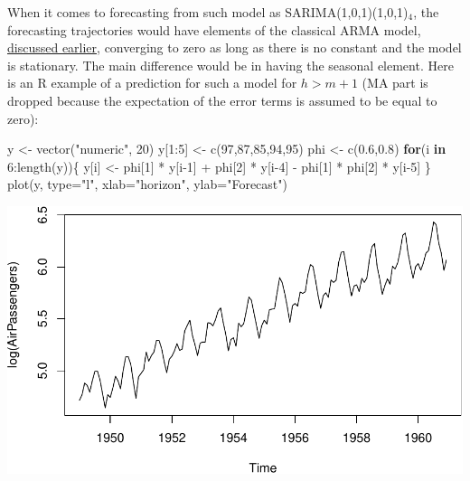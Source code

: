 \documentclass[
]{book}
\newenvironment{Shaded}{\begin{snugshade}}{\end{snugshade}}
\newcommand{\AttributeTok}[1]{\textcolor[rgb]{0.77,0.63,0.00}{#1}}
\newcommand{\ControlFlowTok}[1]{\textcolor[rgb]{0.13,0.29,0.53}{\textbf{#1}}}
\newcommand{\DecValTok}[1]{\textcolor[rgb]{0.00,0.00,0.81}{#1}}
\newcommand{\FloatTok}[1]{\textcolor[rgb]{0.00,0.00,0.81}{#1}}
\newcommand{\FunctionTok}[1]{\textcolor[rgb]{0.00,0.00,0.00}{#1}}
\newcommand{\NormalTok}[1]{#1}
\newcommand{\OtherTok}[1]{\textcolor[rgb]{0.56,0.35,0.01}{#1}}
\newcommand{\SpecialCharTok}[1]{\textcolor[rgb]{0.00,0.00,0.00}{#1}}
\newcommand{\StringTok}[1]{\textcolor[rgb]{0.31,0.60,0.02}{#1}}
\theoremstyle{definition}
\theoremstyle{definition}
\theoremstyle{definition}
\theoremstyle{definition}
\theoremstyle{remark}
\begin{document}
When it comes to forecasting from such model as SARIMA(1,0,1)(1,0,1)\(_4\), the forecasting trajectories would have elements of the classical ARMA model, \protect\hyperlink{ARMA}{discussed earlier}, converging to zero as long as there is no constant and the model is stationary. The main difference would be in having the seasonal element. Here is an R example of a prediction for such a model for \(h>m+1\) (MA part is dropped because the expectation of the error terms is assumed to be equal to zero):

\begin{Shaded}
\begin{Highlighting}[]
\NormalTok{y }\OtherTok{\textless{}{-}} \FunctionTok{vector}\NormalTok{(}\StringTok{"numeric"}\NormalTok{, }\DecValTok{20}\NormalTok{)}
\NormalTok{y[}\DecValTok{1}\SpecialCharTok{:}\DecValTok{5}\NormalTok{] }\OtherTok{\textless{}{-}} \FunctionTok{c}\NormalTok{(}\DecValTok{97}\NormalTok{,}\DecValTok{87}\NormalTok{,}\DecValTok{85}\NormalTok{,}\DecValTok{94}\NormalTok{,}\DecValTok{95}\NormalTok{)}
\NormalTok{phi }\OtherTok{\textless{}{-}} \FunctionTok{c}\NormalTok{(}\FloatTok{0.6}\NormalTok{,}\FloatTok{0.8}\NormalTok{)}
\ControlFlowTok{for}\NormalTok{(i }\ControlFlowTok{in} \DecValTok{6}\SpecialCharTok{:}\FunctionTok{length}\NormalTok{(y))\{}
\NormalTok{    y[i] }\OtherTok{\textless{}{-}}\NormalTok{ phi[}\DecValTok{1}\NormalTok{] }\SpecialCharTok{*}\NormalTok{ y[i}\DecValTok{{-}1}\NormalTok{] }\SpecialCharTok{+}\NormalTok{ phi[}\DecValTok{2}\NormalTok{] }\SpecialCharTok{*}\NormalTok{ y[i}\DecValTok{{-}4}\NormalTok{] }\SpecialCharTok{{-}}
\NormalTok{      phi[}\DecValTok{1}\NormalTok{] }\SpecialCharTok{*}\NormalTok{ phi[}\DecValTok{2}\NormalTok{] }\SpecialCharTok{*}\NormalTok{ y[i}\DecValTok{{-}5}\NormalTok{]}
\NormalTok{\}}
\FunctionTok{plot}\NormalTok{(y, }\AttributeTok{type=}\StringTok{"l"}\NormalTok{, }\AttributeTok{xlab=}\StringTok{"horizon"}\NormalTok{, }\AttributeTok{ylab=}\StringTok{"Forecast"}\NormalTok{)}
\end{Highlighting}
\end{Shaded}

\includegraphics{adam_files/figure-latex/unnamed-chunk-49-1.pdf}
\end{document}
